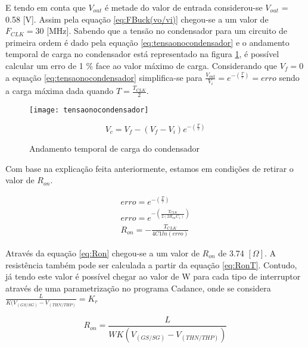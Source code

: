 \documentclass[12pt]{article}
\begin{document}
E tendo em conta que $V_{out}$ é metade do valor de entrada considerou-se $V_{out}$ = 0.58 [V]. Assim pela equação \ref{eq:FBuck(vo/vi)} chegou-se a um valor de $F_{CLK} = 30$ [MHz].
Sabendo que a tensão no condensador para um circuito de primeira ordem é dado pela equação \ref{eq:tensaonocondensador} e o andamento temporal de carga no condensador está representado na figura \ref{fig:tensaonoc}, é possível calcular um erro de 1 \% face ao valor máximo de carga. Considerando que $V_f  = 0 $ a equação \ref{eq:tensaonocondensador} simplifica-se para $\frac{V_{out}}{V_i} =  e^{-(\frac{T}{\tau})} = erro$ sendo a carga máxima dada quando $T = \frac{T_{CLK}}{2}$.


\begin{figure}[htbp]
	\centering
	\begin{minipage}{.5\textwidth}
		\centering
		\texttt{[image: tensaonocondensador]}
		\caption{Andamento temporal de carga do condensador}
		\label{fig:tensaonoc}
	\end{minipage}%
	\begin{minipage}{.5\textwidth}
		\centering
		{\footnotesize \begin{equation}
			\label{eq:tensaonocondensador}
			 V_c = V_f-(V_f-V_i)e^{-(\frac{T}{\tau})}
		\end{equation}} 
	\end{minipage}
\end{figure}

Com base na explicação feita anteriormente, estamos em condições de retirar o valor de $R_{on}$.

{\footnotesize \begin{equation}
\label{eq:Ron}
\begin{array}{cc}
erro  = e^{-(\frac{T}{\tau})} \\ [1em]
erro = e^{-(\frac{T_{CLK}}{2(2R_{on}C_1)})} \\ [1em]
R_{on} = -\frac{T_{CLK}}{4C1ln(erro)}
\end{array}
\end{equation}}

Através da equação \ref{eq:Ron} chegou-se a um valor de $R_{on}$ de 3.74 $[\Omega]$. 
A resistência também pode ser calculada a partir da equação \ref{eq:RonT}. Contudo, já tendo este valor é possível chegar ao valor de W para cada tipo de interruptor através de uma parametrização no programa Cadance, onde se considera $\frac{L}{K(V_{(GS/SG)} - V_{(THN/THP)}} = K_r$ 

{\footnotesize \begin{equation}
	\label{eq:RonT}
	R_{on}= \frac{L}{WK(V_{(GS/SG)} - V_{(THN/THP)})}
\end{equation}}
\end{document}
